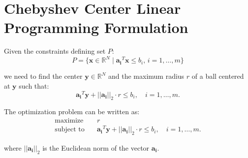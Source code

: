 \documentclass{article}
\begin{document}
\section*{Chebyshev Center Linear Programming Formulation}

Given the constraints defining set \( P \):
\[ 
P = \{ \mathbf{x} \in \mathbb{R}^N \mid \mathbf{a_i}^T \mathbf{x} \leq b_i, \, i = 1, \ldots, m \}
\]

we need to find the center \(\mathbf{y} \in \mathbb{R}^N\) and the maximum radius \(r\) of a ball centered at \(\mathbf{y}\) such that:
\[ 
\mathbf{a_i}^T \mathbf{y} + ||\mathbf{a_i}||_2 \cdot r \leq b_i, \quad i = 1, \ldots, m.
\]

The optimization problem can be written as:
\[
\begin{align*}
\text{maximize} \quad & r \\
\text{subject to} \quad & \mathbf{a_i}^T \mathbf{y} + ||\mathbf{a_i}||_2 \cdot r \leq b_i, \quad i = 1, \ldots, m.
\end{align*}
\]

\noindent where \(||\mathbf{a_i}||_2\) is the Euclidean norm of the vector \(\mathbf{a_i}\).
\end{document}
